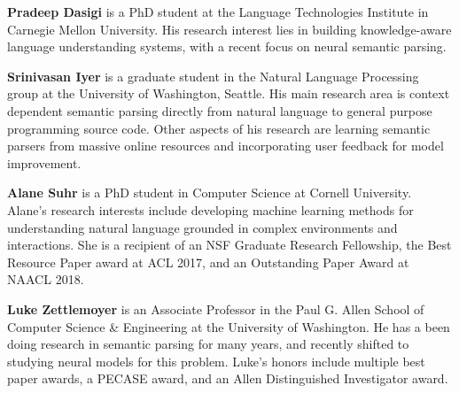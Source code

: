   {\bfseries Pradeep Dasigi} is a PhD student at the Language
Technologies Institute in Carnegie Mellon
University. His research interest lies in building
knowledge-aware language understanding systems,
with a recent focus on neural semantic parsing.

  {\bfseries Srinivasan Iyer} is a graduate student in the Natural
Language Processing group at the University
of Washington, Seattle. His main research area is
context dependent semantic parsing directly from
natural language to general purpose programming
source code. Other aspects of his research are
learning semantic parsers from massive online resources
and incorporating user feedback for model
improvement.

  {\bfseries Alane Suhr} is a PhD student in Computer Science
at Cornell University. Alane’s research interests
include developing machine learning methods for
understanding natural language grounded in complex
environments and interactions. She is a recipient
of an NSF Graduate Research Fellowship, the
Best Resource Paper award at ACL 2017, and an
Outstanding Paper Award at NAACL 2018.

  {\bfseries Luke Zettlemoyer} is an Associate
Professor in the Paul G. Allen School of
Computer Science \& Engineering at the University
of Washington. He has a been doing research
in semantic parsing for many years, and recently
shifted to studying neural models for this problem.
Luke’s honors include multiple best paper awards,
a PECASE award, and an Allen Distinguished Investigator
award.




